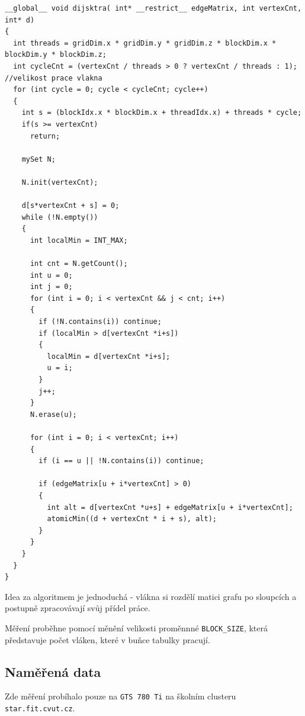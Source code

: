 \documentclass[10pt,a4paper]{article}
\begin{document}
\begin{verbatim}
__global__ void dijsktra( int* __restrict__ edgeMatrix, int vertexCnt, int* d)
{
  int threads = gridDim.x * gridDim.y * gridDim.z * blockDim.x * blockDim.y * blockDim.z;
  int cycleCnt = (vertexCnt / threads > 0 ? vertexCnt / threads : 1); //velikost prace vlakna
  for (int cycle = 0; cycle < cycleCnt; cycle++)
  {
    int s = (blockIdx.x * blockDim.x + threadIdx.x) + threads * cycle;
    if(s >= vertexCnt) 
      return;
			
    mySet N; 
		
    N.init(vertexCnt);

    d[s*vertexCnt + s] = 0;
    while (!N.empty())
    {
      int localMin = INT_MAX;

      int cnt = N.getCount();
      int u = 0;
      int j = 0;
      for (int i = 0; i < vertexCnt && j < cnt; i++)
      {
        if (!N.contains(i)) continue;
        if (localMin > d[vertexCnt *i+s])
        {
          localMin = d[vertexCnt *i+s];
          u = i;
        }
        j++;
      }
      N.erase(u);

      for (int i = 0; i < vertexCnt; i++)
      {
        if (i == u || !N.contains(i)) continue;

        if (edgeMatrix[u + i*vertexCnt] > 0)
        {
          int alt = d[vertexCnt *u+s] + edgeMatrix[u + i*vertexCnt];
          atomicMin((d + vertexCnt * i + s), alt);
        }
      }
    }
  }
}
\end{verbatim}

Idea za algoritmem je jednoduchá - vlákna si rozdělí matici grafu po sloupcích a postupně zpracovávají svůj přídel práce.

Měření proběhne pomocí měnění velikosti proměnnné \texttt{BLOCK\_SIZE}, která představuje počet vláken, které v buňce tabulky pracují.

\subsection{Naměřená data}

Zde měření probíhalo pouze na \texttt{GTS 780 Ti} na školním clusteru \texttt{star.fit.cvut.cz}.
\end{document}
